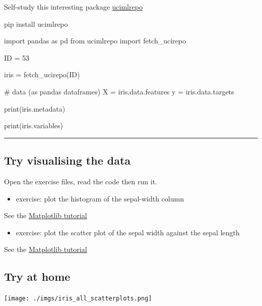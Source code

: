 \documentclass[
  letterpaper,
  DIV=11,
  numbers=noendperiod]{scrartcl}
\newenvironment{Shaded}{\begin{snugshade}}{\end{snugshade}}
\newcommand{\BuiltInTok}[1]{\textcolor[rgb]{0.00,0.23,0.31}{#1}}
\newcommand{\CommentTok}[1]{\textcolor[rgb]{0.37,0.37,0.37}{#1}}
\newcommand{\DecValTok}[1]{\textcolor[rgb]{0.68,0.00,0.00}{#1}}
\newcommand{\ImportTok}[1]{\textcolor[rgb]{0.00,0.46,0.62}{#1}}
\newcommand{\NormalTok}[1]{\textcolor[rgb]{0.00,0.23,0.31}{#1}}
\newcommand{\OperatorTok}[1]{\textcolor[rgb]{0.37,0.37,0.37}{#1}}
\providecommand{\tightlist}{%
  \setlength{\itemsep}{0pt}\setlength{\parskip}{0pt}}\usepackage{longtable,booktabs,array}
\begin{document}
Self-study this interesting package
\href{https://pypi.org/project/ucimlrepo/}{ucimlrepo}

\begin{Shaded}
\begin{Highlighting}[]
\NormalTok{pip install ucimlrepo}
\end{Highlighting}
\end{Shaded}

\begin{Shaded}
\begin{Highlighting}[]
\ImportTok{import}\NormalTok{ pandas }\ImportTok{as}\NormalTok{ pd}
\ImportTok{from}\NormalTok{ ucimlrepo }\ImportTok{import}\NormalTok{ fetch\_ucirepo }
  
\NormalTok{ID }\OperatorTok{=} \DecValTok{53}

\NormalTok{iris }\OperatorTok{=}\NormalTok{ fetch\_ucirepo(ID) }
  
\CommentTok{\# data (as pandas dataframes) }
\NormalTok{X }\OperatorTok{=}\NormalTok{ iris.data.features }
\NormalTok{y }\OperatorTok{=}\NormalTok{ iris.data.targets }
  
\BuiltInTok{print}\NormalTok{(iris.metadata) }
  
\BuiltInTok{print}\NormalTok{(iris.variables) }
\end{Highlighting}
\end{Shaded}

\begin{center}\rule{0.5\linewidth}{0.5pt}\end{center}

\subsection{Try visualising the data}\label{try-visualising-the-data}

Open the exercise files, read the code then run it.

\begin{itemize}
\tightlist
\item
  exercise: plot the histogram of the sepal-width column
\end{itemize}

See the
\href{https://matplotlib.org/3.1.1/gallery/statistics/hist.html}{Matplotlib
tutorial}

\begin{itemize}
\tightlist
\item
  exercise: plot the scatter plot of the sepal width against the sepal
  length
\end{itemize}

See the
\href{https://matplotlib.org/3.1.1/api/_as_gen/matplotlib.pyplot.scatter.html}{Matplotlib
tutorial}

\subsection{Try at home}\label{try-at-home}

\texttt{[image: ./imgs/iris\_all\_scatterplots.png]}
\end{document}
